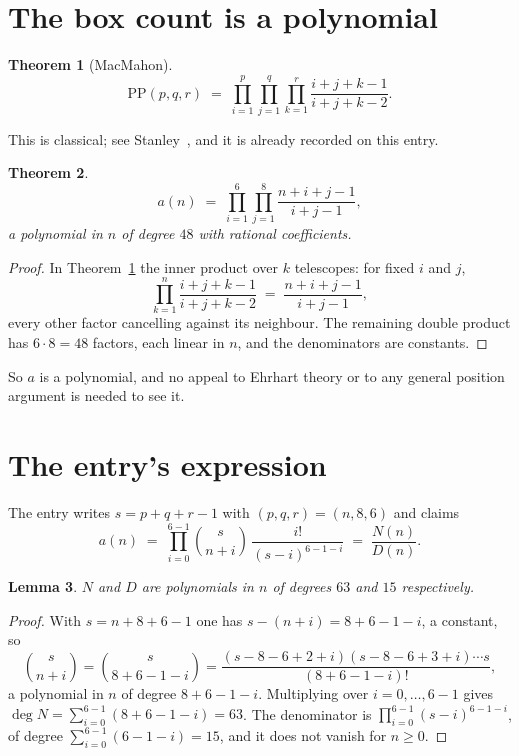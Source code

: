 \documentclass[11pt,a4paper]{article}
\theoremstyle{plain}
\newtheorem{theorem}{Theorem}
\newtheorem{lemma}[theorem]{Lemma}
\theoremstyle{definition}
\begin{document}
\section{The box count is a polynomial}

\begin{theorem}[MacMahon]\label{thm:mm}
\[
\mathrm{PP}(p,q,r)\;=\;\prod_{i=1}^{p}\prod_{j=1}^{q}\prod_{k=1}^{r}
\frac{i+j+k-1}{i+j+k-2} .
\]
\end{theorem}

This is classical; see Stanley~\cite{stanley}, and it is already recorded on this entry.

\begin{theorem}\label{thm:poly}
\[
a(n)\;=\;\prod_{i=1}^{6}\prod_{j=1}^{8}\frac{n+i+j-1}{i+j-1},
\]
a polynomial in $n$ of degree $48$ with rational coefficients.
\end{theorem}

\begin{proof}
In Theorem~\ref{thm:mm} the inner product over $k$ telescopes: for fixed $i$ and $j$,
\[
\prod_{k=1}^{n}\frac{i+j+k-1}{i+j+k-2}\;=\;\frac{n+i+j-1}{i+j-1} ,
\]
every other factor cancelling against its neighbour. The remaining double product has
$6\cdot8=48$ factors, each linear in $n$, and the denominators are constants.
\end{proof}

So $a$ is a polynomial, and no appeal to Ehrhart theory or to any general position argument is
needed to see it.

\section{The entry's expression}

The entry writes $s=p+q+r-1$ with $(p,q,r)=(n,8,6)$ and claims
\[
a(n)\;=\;\prod_{i=0}^{6-1}\binom{s}{n+i}\,\frac{i!}{(s-i)^{6-1-i}}\;=\;
\frac{N(n)}{D(n)} .
\]

\begin{lemma}\label{lem:deg}
$N$ and $D$ are polynomials in $n$ of degrees $63$ and $15$ respectively.
\end{lemma}

\begin{proof}
With $s=n+8+6-1$ one has $s-(n+i)=8+6-1-i$, a constant, so
\[
\binom{s}{n+i}=\binom{s}{8+6-1-i}
=\frac{(s-8-6+2+i)(s-8-6+3+i)\cdots s}{(8+6-1-i)!},
\]
a polynomial in $n$ of degree $8+6-1-i$. Multiplying over $i=0,\dots,6-1$ gives
$\deg N=\sum_{i=0}^{6-1}(8+6-1-i)=63$. The denominator is
$\prod_{i=0}^{6-1}(s-i)^{6-1-i}$, of degree
$\sum_{i=0}^{6-1}(6-1-i)=15$, and it does not vanish for $n\ge0$.
\end{proof}
\end{document}
